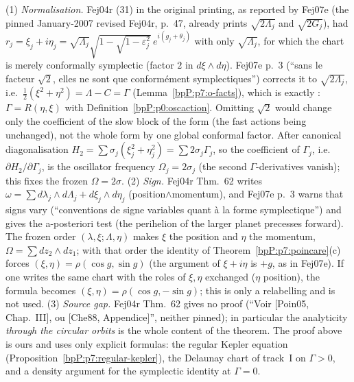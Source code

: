 \begin{remark}\label{bpP:p7:normalisation}
(1) \emph{Normalisation.} Fej04r (31) in the original printing, as reported by Fej07e (the pinned January-2007 revised Fej04r, p.~47, already prints $\sqrt{2\Lambda_j}$ and $\sqrt{2G_j}$), had $r_j=\xi_j+i\eta_j=\sqrt{\Lambda_j}\sqrt{1-\sqrt{1-\varepsilon_j^2}}\,e^{i(g_j+\theta_j)}$ with only $\sqrt{\Lambda_j}$, for which the chart is merely conformally symplectic (factor $2$ in $d\xi\wedge d\eta$). Fej07e p.~3 (``sans le facteur $\sqrt2$, elles ne sont que conform\'ement symplectiques'') corrects it to $\sqrt{2\Lambda_j}$, i.e.\ $\frac12(\xi^2+\eta^2)=\Lambda-C=\Gamma$ (Lemma~\ref{bpP:p7:o-facts}), which is exactly : $\Gamma=R(\eta,\xi)$ with Definition~\ref{bpP:p0:oscaction}. Omitting $\sqrt2$ would change only the coefficient of the slow block of the form (the fast actions being unchanged), not the whole form by one global conformal factor. After canonical diagonalisation $H_2=\sum\sigma_j(\xi_j^2+\eta_j^2)=\sum2\sigma_j\Gamma_j$, so the coefficient of $\Gamma_j$, i.e.\ $\partial H_2/\partial\Gamma_j$, is the oscillator frequency $\Omega_j=2\sigma_j$ (the second $\Gamma$-derivatives vanish); this fixes the frozen $\Omega=2\sigma$.
(2) \emph{Sign.} Fej04r Thm.~62 writes $\omega=\sum d\lambda_j\wedge d\Lambda_j+d\xi_j\wedge d\eta_j$ (position$\wedge$momentum), and Fej07e p.~3 warns that signs vary (``conventions de signe variables quant \`a la forme symplectique'') and gives the a-posteriori test (the perihelion of the larger planet precesses forward). The frozen order $(\lambda,\xi;\Lambda,\eta)$ makes $\xi$ the position and $\eta$ the momentum, $\Omega=\sum dz_2\wedge dz_1$; with that order the identity of Theorem~\ref{bpP:p7:poincare}(c) forces $(\xi,\eta)=\rho(\cos g,\sin g)$ (the argument of $\xi+i\eta$ is $+g$, as in Fej07e). If one writes the same chart with the roles of $\xi,\eta$ exchanged ($\eta$ position), the formula becomes $(\xi,\eta)=\rho(\cos g,-\sin g)$; this is only a relabelling and is not used.
(3) \emph{Source gap.} Fej04r Thm.~62 gives no proof (``Voir [Poin05, Chap.~III], ou [Che88, Appendice]'', neither pinned); in particular the analyticity \emph{through the circular orbits} is the whole content of the theorem. The proof above is ours and uses only explicit formulas: the regular Kepler equation (Proposition~\ref{bpP:p7:regular-kepler}), the Delaunay chart of track~I on $\Gamma>0$, and a density argument for the symplectic identity at $\Gamma=0$.
\end{remark}

